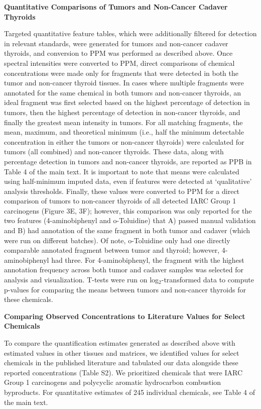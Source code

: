 \vspace{1em}

\noindent\textbf{Quantitative Comparisons of Tumors and Non-Cancer Cadaver Thyroids}

Targeted quantitative feature tables, which were additionally filtered for detection in relevant standards, were generated for tumors and non-cancer cadaver thyroids, and conversion to PPM was performed as described above. Once spectral intensities were converted to PPM, direct comparisons of chemical concentrations were made only for fragments that were detected in both the tumor and non-cancer thyroid tissues. In cases where multiple fragments were annotated for the same chemical in both tumors and non-cancer thyroids, an ideal fragment was first selected based on the highest percentage of detection in tumors, then the highest percentage of detection in non-cancer thyroids, and finally the greatest mean intensity in tumors. For all matching fragments, the mean, maximum, and theoretical minimum (i.e., half the minimum detectable concentration in either the tumors or non-cancer thyroids) were calculated for tumors (all combined) and non-cancer thyroids. These data, along with percentage detection in tumors and non-cancer thyroids, are reported as PPB in Table 4 of the main text. It is important to note that means were calculated using half-minimum imputed data, even if features were detected at `qualitative' analysis thresholds. Finally, these values were converted to PPM for a direct comparison of tumors to non-cancer thyroids of all detected IARC Group 1 carcinogens (Figure 3E, 3F); however, this comparison was only reported for the two features (4-aminobiphenyl and o-Toluidine) that A) passed manual validation and B) had annotation of the same fragment in both tumor and cadaver (which were run on different batches). Of note, o-Toluidine only had one directly comparable annotated fragment between tumor and thyroid; however, 4-aminobiphenyl had three. For 4-aminobiphenyl, the fragment with the highest annotation frequency across both tumor and cadaver samples was selected for analysis and visualization. T-tests were run on log$_2$-transformed data to compute p-values for comparing the means between tumors and non-cancer thyroids for these chemicals.

\vspace{1em}

\noindent\textbf{Comparing Observed Concentrations to Literature Values for Select Chemicals}

To compare the quantification estimates generated as described above with estimated values in other tissues and matrices, we identified values for select chemicals in the published literature and tabulated our data alongside these reported concentrations (Table S2). We prioritized chemicals that were IARC Group 1 carcinogens and polycyclic aromatic hydrocarbon combustion byproducts. For quantitative estimates of 245 individual chemicals, see Table 4 of the main text.
